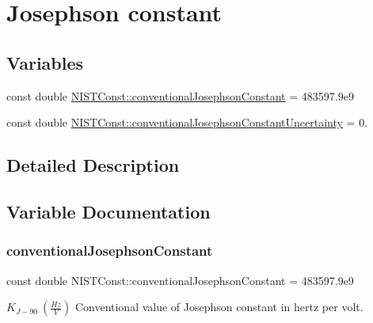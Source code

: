 \hypertarget{group___conventional_josephson_constant}{}\section{Josephson constant}
\label{group___conventional_josephson_constant}
\subsection*{Variables}
\begin{DoxyCompactItemize}
\item 
const double \hyperlink{group___conventional_josephson_constant_gaebced2333dcb300798ec2d2c128db9b9}{N\+I\+S\+T\+Const\+::conventional\+Josephson\+Constant} = 483597.\+9e9
\item 
const double \hyperlink{group___conventional_josephson_constant_ga0a76d60ad55268297c99761c7492220f}{N\+I\+S\+T\+Const\+::conventional\+Josephson\+Constant\+Uncertainty} = 0.
\end{DoxyCompactItemize}


\subsection{Detailed Description}


\subsection{Variable Documentation}
\mbox{\label{group___conventional_josephson_constant_gaebced2333dcb300798ec2d2c128db9b9}} 
\subsubsection{\texorpdfstring{conventional\+Josephson\+Constant}{conventionalJosephsonConstant}}
{\footnotesize\ttfamily const double N\+I\+S\+T\+Const\+::conventional\+Josephson\+Constant = 483597.\+9e9}

$K_{J-90} \ (\frac{Hz}{V})$ Conventional value of Josephson constant in hertz per volt. \mbox{\label{group___conventional_josephson_constant_ga0a76d60ad55268297c99761c7492220f}} 
